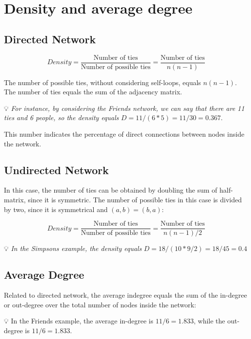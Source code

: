 \documentclass[
  notitlepage,
  onecolumn,
  openany]{book}
\begin{document}
\hypertarget{density-and-average-degree}{%
\section{Density and average degree}\label{density-and-average-degree}}

\hypertarget{directed-network-1}{%
\subsection{Directed Network}\label{directed-network-1}}

\[
Density = \frac{\text{Number of ties}}{\text{Number of possible ties}} =\frac{\text{Number of ties}}{n(n-1)} 
\]

The number of possible ties, without considering self-loops, equals \(n(n-1)\). The number of ties equals the sum of the adjacency matrix.

💡 \emph{For instance, by considering the Friends network, we can say that there are 11 ties and 6 people, so the density equals} \(D = 11/(6*5) = 11/30 = 0.367\).

This number indicates the percentage of direct connections between nodes inside the network.

\hypertarget{undirected-network-1}{%
\subsection{Undirected Network}\label{undirected-network-1}}

In this case, the number of ties can be obtained by doubling the sum of half-matrix, since it is symmetric. The number of possible ties in this case is divided by two, since it is symmetrical and \((a,b) = (b,a)\):

\[
Density = \frac{\text{Number of ties}}{\text{Number of possible ties}} =\frac{\text{Number of ties}}{n(n-1)/2} 
\]

💡 \emph{In the Simpsons example, the density equals} \(D = 18/(10*9/2) = 18/45 = 0.4\)

\hypertarget{average-degree}{%
\subsection{Average Degree}\label{average-degree}}

Related to directed network, the average indegree equals the sum of the in-degree or out-degree over the total number of nodes inside the network:

💡 In the Friends example, the average in-degree is \(11/6 = 1.833\), while the out-degree is \(11/6 = 1.833\).
\end{document}
